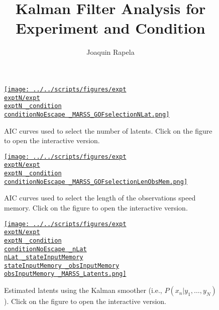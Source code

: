 \documentclass[12 pt]{article}  %
\title{Kalman Filter Analysis for Experiment {\exptN} and Condition {\condition}}
\author{Joaquin Rapela}
\begin{document}
\maketitle

\listoffigures

\begin{figure}
    \begin{center}
            \href{http://www.gatsby.ucl.ac.uk/~rapela/sepi/reports/kfAnalysis/figures/expt\exptN/expt\exptN _condition\conditionNoEscape _MARSS_GOFselectionNLat.html}{\texttt{[image: ../../scripts/figures/expt\\exptN/expt\\exptN \_condition\\conditionNoEscape \_MARSS\_GOFselectionNLat.png]}}
            \caption{AIC curves used to select the number of latents. Click on the figure to open the interactive version.}
        \label{fig:dimLatAICCurves}
    \end{center}
\end{figure}

\begin{figure}
    \begin{center}
            \href{http://www.gatsby.ucl.ac.uk/~rapela/sepi/reports/kfAnalysis/figures/expt\exptN/expt\exptN _condition\conditionNoEscape _MARSS_GOFselectionLenObsMem.html}{\texttt{[image: ../../scripts/figures/expt\\exptN/expt\\exptN \_condition\\conditionNoEscape \_MARSS\_GOFselectionLenObsMem.png]}}
            \caption{AIC curves used to select the length of the observations speed memory. Click on the figure to open the interactive version.}
        \label{fig:obsMemoryAICCurves}
    \end{center}
\end{figure}

\begin{figure}
    \begin{center}
            \href{http://www.gatsby.ucl.ac.uk/~rapela/sepi/reports/kfAnalysis/figures/expt\exptN/expt\exptN _condition\conditionNoEscape _nLat\nLat _stateInputMemory\stateInputMemory _obsInputMemory\obsInputMemory _MARSS_Latents.html}{\texttt{[image: ../../scripts/figures/expt\\exptN/expt\\exptN \_condition\\conditionNoEscape \_nLat\\nLat \_stateInputMemory\\stateInputMemory \_obsInputMemory\\obsInputMemory \_MARSS\_Latents.png]}}
            \caption{Estimated latents using the Kalman smoother (i.e., $P(x_n|y_1,\ldots,y_N)$). Click on the figure to open the interactive version.}
        \label{fig:latents}
    \end{center}
\end{figure}
\end{document}
